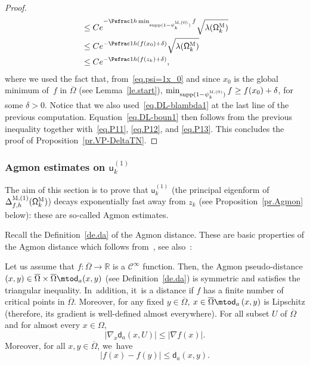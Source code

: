 \begin{proof}
\begin{align*}
&\le Ce^{-\Psfrac 1h \min_{\text{supp}(1- \psi^{\textsc{M},(0)}_k)} f} \sqrt{\lambda(\mathsf \Omega_k^{\textsc{M}}) }\\
&\le Ce^{-\Psfrac 1h (f(x_0)+\delta)} \sqrt{\lambda(\mathsf \Omega_k^{\textsc{M}}) }\\
&\le Ce^{-\Psfrac 1h (f(z_k)+\delta)},
\end{align*}
where we used the fact that, from~\eqref{eq.psi=1x_0} and since $x_0$ is the global minimum of~$f$ in $\overline \Omega$ (see Lemma~\ref{le.start}), $\min_{\text{supp}(1- \psi^{\textsc{M},(0)}_k)} f\ge f(x_0)+\delta$, for some $\delta>0$. Notice that we also used~\eqref{eq.DL-blambda1} at the last line of the previous computation.
Equation~\eqref{eq.DL-boun1} then follows from the previous inequality together with~\eqref{eq.P11}, \eqref{eq.P12}, and \eqref{eq.P13}.
This concludes the proof of Proposition~\ref{pr.VP-DeltaTN}.
\end{proof}

\subsubsection{Agmon estimates on $\mathsf u^{(1)}_k$}\label{sec.Agmon1}

The aim of this section is to prove that $\mathsf u^{(1)}_k$ (the
principal eigenform of $ \Delta_{f,h}^{\textsc{M},(1)} (\mathsf \Omega_k^{\textsc{M}}) $) decays
exponentially fast away from $z_k$ (see Proposition~\ref{pr.Agmon} below): these are so-called Agmon
estimates.

Recall the Definition~\ref{de.da} of the Agmon distance. These are basic properties of the Agmon distance which follows from~\cite[App.\,2]{helffer-sjostrand-85}, see also~\cite[Lem.\,3.2]{LeNi}:

\begin{proposition}
\label{pr.p-agmon}
Let us assume that $f:\overline \Omega\to \mathbb R$ is a $\mathcal C^\infty$ function. Then, the Agmon pseudo-distance $(x,y)\in \overline \Omega \times\overline \Omega \mto \mathsf d_a(x,y)$ (see Definition~\ref{de.da}) is symmetric and satisfies the triangular inequality. In~addition, it~is a distance if $f$ has a finite number of critical points in $\overline \Omega$.
Moreover, for any fixed $y \in \overline \Omega$, $x \in \overline \Omega\mto
\mathsf d_a\left(x,y\right)$ is Lipschitz (therefore, its gradient is well-defined almost everywhere). For all subset $U$ of $\overline \Omega$ and for almost every $x \in \Omega$,
\begin{equation} \label{eq.eqq}
\vert \nabla_x \mathsf d_a\left(x,U\right) \vert \leq \vert \nabla f (x) \vert.
\end{equation}
Moreover, for all $x,y \in \overline \Omega$, we~have
\begin{equation} \label{eq.ineq}
\vert f(x)-f(y)\vert \leq \mathsf d_a(x,y).
\end{equation}
\end{proposition}

